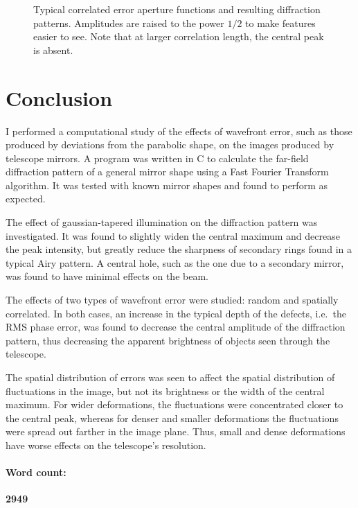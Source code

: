 \documentclass{article}
\newcommand{\CC}{{C\nolinebreak[4]\hspace{-.05em}\raisebox{.3ex}{\scriptsize\bf ++}}}
\begin{document}
\begin{figure}
    \caption{Typical correlated error aperture functions and resulting diffraction patterns. Amplitudes are raised to the power $1/2$ to make features easier to see. Note that at larger correlation length, the central peak is absent.}\label{fig:corrpic}
\end{figure}
\restoregeometry{}

\section{Conclusion}\label{sec:conclusion}
I performed a computational study of the effects of wavefront error, such as those produced by deviations from the parabolic shape, on the images produced by telescope mirrors. A program was written in \CC{} to calculate the far-field diffraction pattern of a general mirror shape using a Fast Fourier Transform algorithm. It was tested with known mirror shapes and found to perform as expected.

The effect of gaussian-tapered illumination on the diffraction pattern was investigated. It was found to slightly widen the central maximum and decrease the peak intensity, but greatly reduce the sharpness of secondary rings found in a typical Airy pattern. A central hole, such as the one due to a secondary mirror, was found to have minimal effects on the beam.

The effects of two types of wavefront error were studied: random and spatially correlated. In both cases, an increase in the typical depth of the defects, i.e.\ the RMS phase error, was found to decrease the central amplitude of the diffraction pattern, thus decreasing the apparent brightness of objects seen through the telescope.

The spatial distribution of errors was seen to affect the spatial distribution of fluctuations in the image, but not its brightness or the width of the central maximum. For wider deformations, the fluctuations were concentrated closer to the central peak, whereas for denser and smaller deformations the fluctuations were spread out farther in the image plane. Thus, small and dense deformations have worse effects on the telescope's resolution.

\paragraph{Word count:} \textbf{2949}

\printbibliography{}
\pagebreak

\appendix
{}
\end{document}

